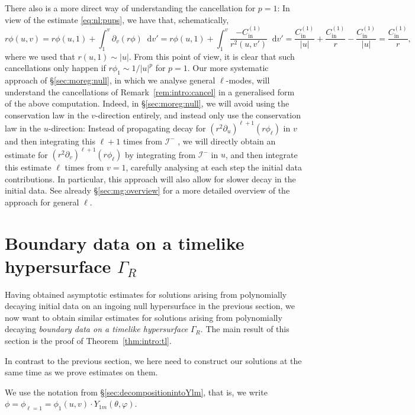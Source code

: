\documentclass[11pt,english]{article}
\numberwithin{equation}{section}
\theoremstyle{remark}
\theoremstyle{plain}
\theoremstyle{remark}
\newcommand{\dd}{\mathop{}\!\mathrm{d}}
\newcommand{\pu}{\partial_u}
\newcommand{\pv}{\partial_v}
\renewcommand{\(}{\left(}
\renewcommand{\)}{\right)}
\newcommand{\cc}{C_{\mathrm{in}}^{(1)}}
\begin{document}
There also is  a more direct way of understanding the cancellation for $p=1$:
In view of the estimate \eqref{eq:nl:pups}, we have that, schematically,
$$r\phi(u,v)=r\phi(u,1)+\int_1^v \pv(r\phi)\dd v'=r\phi(u,1)+\int_1^v \frac{-\cc}{r^2(u,v')}\dd v'  =\frac{\cc}{|u|}+\frac{\cc}{r}-\frac{\cc}{|u|}=\frac{\cc}{r},
$$
where we used that $r(u,1)\sim |u|$. From this point of view, it is clear that such cancellations only happen if $r\phi_1\sim 1/|u|^p$ for $p=1$. Our more systematic approach of \S\ref{sec:moreg:null}, in which we analyse general $\ell$-modes,  will understand the cancellations of Remark~\ref{rem:intro:cancel} in a generalised form of the above computation. 
Indeed, in \S\ref{sec:moreg:null}, we will avoid using the conservation law in the $v$-direction entirely, and instead only use the conservation law in the $u$-direction:
 Instead of propagating decay for $(r^2\pu)^{\ell+1}(r\phi_\ell)$ in $v$ and then integrating this $\ell+1$ times from $\mathcal I^-$ , we will directly obtain an estimate for $(r^2\pv)^{\ell+1}(r\phi_\ell)$ by integrating from $\mathcal I^-$ in $u$, and then integrate this estimate $\ell$ times from $v=1$, carefully analysing at each step the initial data contributions. 
 In particular, this approach will  also allow for slower decay in the initial data. 
 See already \S\ref{sec:mg:overview} for a more detailed overview of the approach for general $\ell$.




\newpage

\section{Boundary data on a timelike hypersurface \texorpdfstring{$\Gamma_R$}{Gamma-R}}\label{sec:timelikeconstantR}
Having obtained asymptotic estimates for solutions arising from polynomially decaying initial data on an ingoing null hypersurface in the previous section, we now want to obtain similar estimates for solutions arising from polynomially decaying \textit{boundary data on a timelike hypersurface} $\Gamma_R$. 
The main result of this section is the proof of Theorem~\ref{thm:intro:tl}. 

In contrast to the previous section, we here need to construct our solutions at the same time as we prove estimates on them.

We use the notation from \S\ref{sec:decompositionintoYlm}, that is, we write $\phi=\phi_{\ell=1}=\phi_1(u,v)\cdot Y_{1m}(\theta,\varphi)$.  
\end{document}
